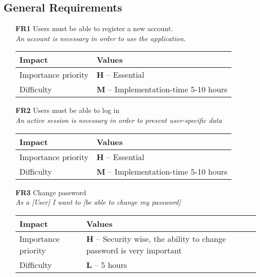 \subsection{General Requirements}
\begin{itemize}
    \vspace{0.5cm}
	\item[\textbf{FR1}] Users must be able to register a new account. \\
        \textit{\small{An account is necessary in order to use the application. }}

        \begin{tabular}{| l | p{7cm} |}
            \hline
            \rowcolor[gray]{0.8}
            \textbf{Impact} & \textbf{Values} \\
            \hline
            Importance priority & \textbf{H} -- Essential \\
            Difficulty & \textbf{M} -- Implementation-time 5-10 hours\\
            \hline
        \end{tabular}
    \vspace{0.5cm}
    \item[\textbf{FR2}] Users must be able to log in \\
        \textit{\small{An active session is necessary in order to present user-specific data}}

        \begin{tabular}{| l | p{7cm} |}
            \hline
            \rowcolor[gray]{0.8}
            \textbf{Impact} & \textbf{Values} \\
            \hline
            Importance priority & \textbf{H} -- Essential \\
            Difficulty & \textbf{M} -- Implementation-time 5-10 hours \\
            \hline
        \end{tabular}
    \vspace{0.5cm}

    \item[\textbf{FR3}] Change password \\
        \textit{\small{As a [User] I want to [be able to change my password]}}

        \begin{tabular}{| l | p{7cm} |}
            \hline
            \rowcolor[gray]{0.8}
            \textbf{Impact} & \textbf{Values} \\
            \hline
            Importance priority & \textbf{H} -- Security wise, the ability to change password is very important\\
            Difficulty & \textbf{L} -- 5 hours \\
            \hline
        \end{tabular}
    \vspace{0.5cm}


\end{itemize}
